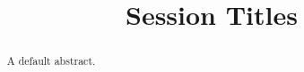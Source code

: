 \documentclass{xourse}
\title{Session Titles}
\begin{document}
\begin{abstract}
    A default abstract.
\end{abstract}
\maketitle

\beginSlides
{}
\end{document}
